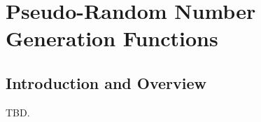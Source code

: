 \chapter{Pseudo-Random Number Generation Functions}
\label{crng1}

\section{Introduction and Overview}
\label{crng1:siov0}

TBD.

